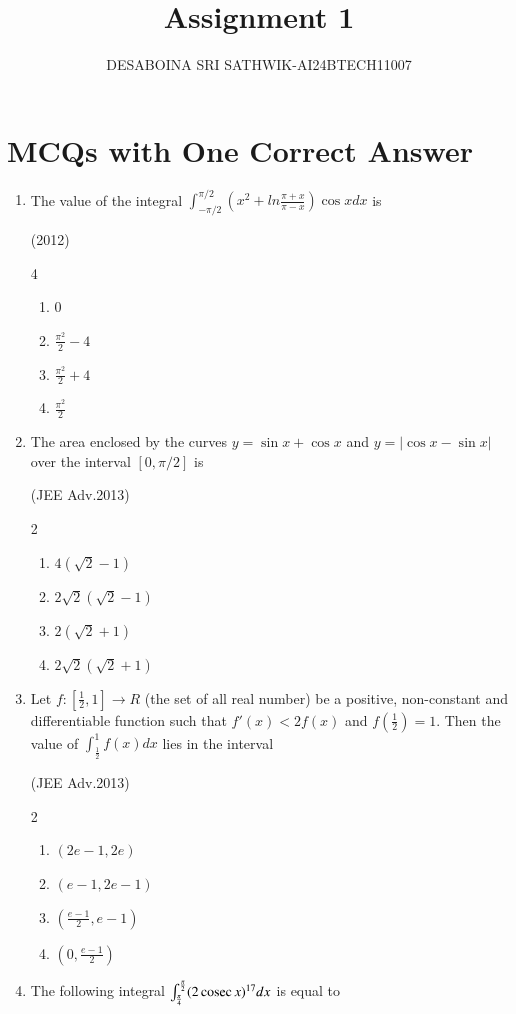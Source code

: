 \documentclass[journal,12pt,twocolumn]{IEEEtran}
\theoremstyle{remark}
\begin{document}

\vspace{3cm}

\title{Assignment 1}
\author{DESABOINA SRI SATHWIK-AI24BTECH11007}
\maketitle
\newpage
\bigskip

\renewcommand{\thefigure}{\theenumi}
\renewcommand{\thetable}{\theenumi}
\section*{MCQs with One Correct Answer}
\begin{enumerate}
\item
The value of the integral $\int_{-\pi/2}^{\pi/2}(x^2+ln\frac{\pi+x}{\pi-x})\cos xdx$ is

	\hfill{(2012)}
		\begin{multicols}{4}
                \begin{enumerate}
        \item 0
        \item $\frac{\pi^2}{2}-4$
        \item $\frac{\pi^2}{2}+4$
        \item $\frac{\pi^2}{2}$
                \end{enumerate}
		\end{multicols}
\item
The area enclosed by the curves $y=\sin x+\cos x$ and $y=|\cos x-\sin x|$ over the interval $[0,\pi/2]$ is

		\hfill{(JEE Adv.2013)}
		\begin{multicols}{2}
		\begin{enumerate}
			\item $4(\sqrt{2}-1)$
			\item $2\sqrt{2}(\sqrt{2}-1)$
			\item $2(\sqrt{2}+1)$
			\item $2\sqrt{2}(\sqrt{2}+1)$
		\end{enumerate}
		\end{multicols}
	\item
		Let $f:[\frac{1}{2},1]\rightarrow R$ (the set of all real number) be a positive, non-constant and differentiable function such that $f'(x)<2f(x)$ and $f(\frac{1}{2})=1$. Then the value of $\int_{\frac{1}{2}}^{1}f(x) dx $ lies in the interval  

		\hfill{(JEE Adv.2013)}
		\begin{multicols}{2}
		\begin{enumerate}
			\item $(2e-1,2e)$
			\item $(e-1,2e-1)$
			\item $(\frac{e-1}{2},e-1)$
			\item $(0,\frac{e-1}{2})$
		\end{enumerate}
		\end{multicols}
	\item
		The following integral $\int_{\frac{\pi}{4}}^{\frac{\pi}{2}}(2\,\text{cosec}\, x)^{17}dx$ is equal to


\end{enumerate}
\end{document}
